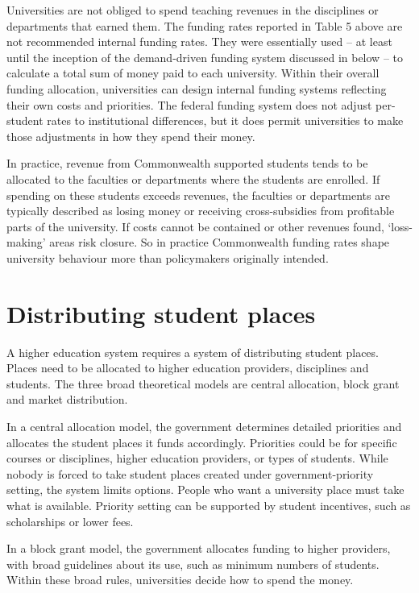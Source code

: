 \documentclass{grattan}
\begin{document}
Universities are not obliged to spend teaching revenues in the disciplines or departments that earned them. The funding rates reported in Table 5 above are not recommended internal funding rates. They were essentially used -- at least until the inception of the demand-driven funding system discussed in  below -- to calculate a total sum of money paid to each university. Within their overall funding allocation, universities can design internal funding systems reflecting their own costs and priorities. The federal funding system does not adjust per-student rates to institutional differences, but it does permit universities to make those adjustments in how they spend their money.

In practice, revenue from Commonwealth supported students tends to be allocated to the faculties or departments where the students are enrolled. If spending on these students exceeds revenues, the faculties or departments are typically described as losing money or receiving cross-subsidies from profitable parts of the university. If costs cannot be contained or other revenues found, `loss-making' areas risk closure. So in practice Commonwealth funding rates shape university behaviour more than policymakers originally intended.

%
\section{Distributing student places}\label{sec:distributing-student-places}

A higher education system requires a system of distributing student places. Places need to be allocated to higher education providers, disciplines and students. The three broad theoretical models are central allocation, block grant and market distribution.

In a central allocation model, the government determines detailed priorities and allocates the student places it funds accordingly. Priorities could be for specific courses or disciplines, higher education providers, or types of students. While nobody is forced to take student places created under government-priority setting, the system limits options. People who want a university place must take what is available. Priority setting can be supported by student incentives, such as scholarships or lower fees.

In a block grant model, the government allocates funding to higher providers, with broad guidelines about its use, such as minimum numbers of students. Within these broad rules, universities decide how to spend the money.
\end{document}
